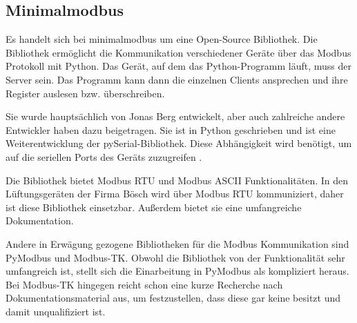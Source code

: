 \subsection{Minimalmodbus}
Es handelt sich bei minimalmodbus um eine Open-Source Bibliothek. Die Bibliothek ermöglicht die Kommunikation verschiedener Geräte über das Modbus Protokoll mit Python. Das Gerät, auf dem das Python-Programm läuft, muss der Server sein. Das Programm kann dann die einzelnen Clients ansprechen und ihre Register auslesen bzw. überschreiben.

Sie wurde hauptsächlich von Jonas Berg entwickelt, aber auch zahlreiche andere Entwickler haben dazu beigetragen. Sie ist in Python geschrieben und ist eine Weiterentwicklung der pySerial-Bibliothek. Diese Abhängigkeit wird benötigt, um auf die seriellen Ports des Geräts zuzugreifen \cite{Chris_Liechti_pySerial:o.J.}. 

Die Bibliothek bietet Modbus RTU und Modbus ASCII Funktionalitäten. In den Lüftungsgeräten der Firma Bösch wird über Modbus RTU kommuniziert, daher ist diese Bibliothek einsetzbar. Außerdem bietet sie eine umfangreiche Dokumentation.
\cite{Jonas_Berg_MiniModbus:2023}
\cite{Jonas_Berg_MiniModbus_Git:o.J.} 

Andere in Erwägung gezogene Bibliotheken für die Modbus Kommunikation sind PyModbus und Modbus-TK. Obwohl die Bibliothek von der Funktionalität sehr umfangreich ist, stellt sich die Einarbeitung in PyModbus als kompliziert heraus. Bei Modbus-TK hingegen reicht schon eine kurze Recherche nach Dokumentationsmaterial aus, um festzustellen, dass diese gar keine besitzt und damit unqualifiziert ist.